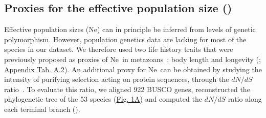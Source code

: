 \subsection{Proxies for the effective population size (\Ne)}\label{sec:LHT_Ne}
Effective population sizes (\acrshort{Ne}) can in principle be inferred from levels of genetic polymorphism. However, population genetics data are lacking for most of the species in our dataset. We therefore used two life history traits that were previously proposed as proxies of \acrshort{Ne}~in metazoans~\citep{waples_life-history_2016,weyna_relaxation_2020, figuet_life_2016}: body length and longevity (; \hyperref[table:2]{Appendix Tab. A.2}). An additional proxy for \acrshort{Ne}~can be obtained by studying the intensity of purifying selection acting on protein sequences, through the ${dN}/{dS}$ ratio~\citep{kryazhimskiy_population_2008}. To evaluate this ratio, we aligned 922 \acrshort{BUSCO} genes, reconstructed the phylogenetic tree of the 53 species (\hyperref[fig:AS1]{Fig. 1A}) and computed the ${dN}/{dS}$ ratio along each terminal branch ().

